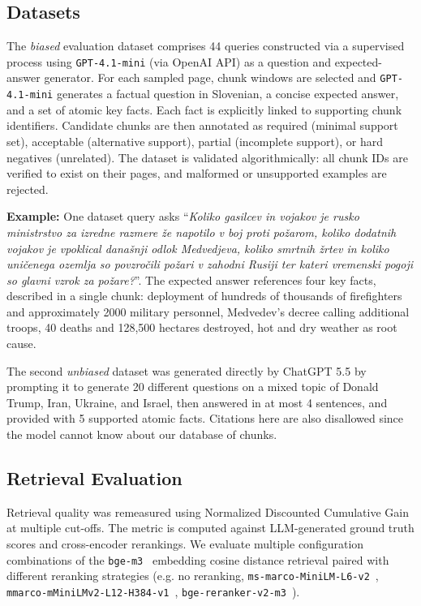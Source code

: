 \documentclass[conference]{IEEEtran}
\begin{document}
\subsection{Datasets}
The \textit{biased} evaluation dataset comprises 44 queries constructed via a supervised process using \texttt{GPT-4.1-mini} (via OpenAI API) as a question and expected-answer generator. For each sampled page, chunk windows are selected and \texttt{GPT-4.1-mini} generates a factual question in Slovenian, a concise expected answer, and a set of atomic key facts. Each fact is explicitly linked to supporting chunk identifiers. Candidate chunks are then annotated as required (minimal support set), acceptable (alternative support), partial (incomplete support), or hard negatives (unrelated). The dataset is validated algorithmically: all chunk IDs are verified to exist on their pages, and malformed or unsupported examples are rejected.

\textbf{Example:} One dataset query asks ``\textit{Koliko gasilcev in vojakov je rusko ministrstvo za izredne razmere že napotilo v boj proti požarom, koliko dodatnih vojakov je vpoklical današnji odlok Medvedjeva, koliko smrtnih žrtev in koliko uničenega ozemlja so povzročili požari v zahodni Rusiji ter kateri vremenski pogoji so glavni vzrok za požare?}''. The expected answer references four key facts, described in a single chunk: deployment of hundreds of thousands of firefighters and approximately 2000 military personnel, Medvedev's decree calling additional troops, 40 deaths and 128,500 hectares destroyed, hot and dry weather as root cause.

The second \textit{unbiased} dataset was generated directly by ChatGPT 5.5 by prompting it to generate 20 different questions on a mixed topic of Donald Trump, Iran, Ukraine, and Israel, then answered in at most 4 sentences, and provided with 5 supported atomic facts. Citations here are also disallowed since the model cannot know about our database of chunks.

\subsection{Retrieval Evaluation}
Retrieval quality was remeasured using Normalized Discounted Cumulative Gain at multiple cut-offs. The metric is computed against LLM-generated ground truth scores and cross-encoder rerankings. We evaluate multiple configuration combinations of the \texttt{bge-m3}~\cite{bge_m3} embedding cosine distance retrieval paired with different reranking strategies (e.g. no reranking, \texttt{ms-marco-MiniLM-L6-v2}~\cite{ms_marco_minilm_l6_v2}, \texttt{mmarco-mMiniLMv2-L12-H384-v1}~\cite{mmarco_minilmv2_l12_h384}, \texttt{bge-reranker-v2-m3}~\cite{bge_reranker_v2_m3}).
\end{document}
